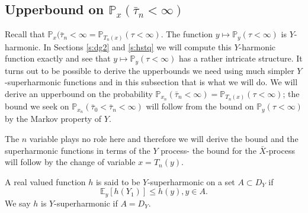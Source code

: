 \documentclass[11pt,a4paper]{article}
\begin{document}
\subsection{Upperbound on ${\mathbb P}_x(\bar\tau_n < \infty)$}\label{ss:tauy}
Recall that 
${\mathbb P}_x(\bar\tau_n < \infty = {\mathbb P}_{T_n(x)}( \tau < \infty)$.
The function
$y\mapsto {\mathbb P}_{y}( \tau < \infty)$
is $Y$-harmonic.
In Sections \ref{s:dg2} and \ref{s:hstq} we will compute this
$Y$-harmonic function exactly and see that
$y\mapsto {\mathbb P}_{y}( \tau < \infty)$
has a rather intricate structure.
It turns out to
be possible to derive the upperbounds we need
using much simpler $Y$-superharmonic
functions and in this subsection that is what we will do.
We will derive an upperbound on the probability 
${\mathbb P}_{x_n}(\bar\tau_n < \infty)={\mathbb P}_{T_n(x)}(\tau <  \infty)$;
the  bound we seek on ${\mathbb P}_{x_n}(\bar\tau_0 < \bar\tau_n < \infty)$
will follow from the bound on ${\mathbb P}_{y}(\tau <  \infty)$
by the Markov property of $Y$.

The $n$ variable plays no role here and therefore we will derive the bound and
the superharmonic functions in terms of the $Y$ process- the bound for the 
$\bar{X}$-process will follow by the change of variable $x = T_n(y).$

A real valued function $h$ is said to be $Y$-superharmonic on a
set $A \subset D_Y$ if
\[
{\mathbb E}_y[h(Y_1)] \le h(y), y \in A.
\]
We say $h$ is $Y$-superharmonic if $A= D_Y$.
\end{document}
